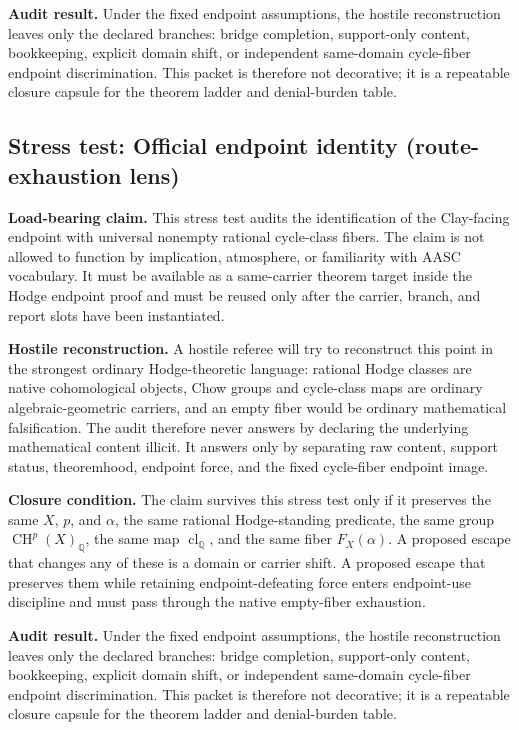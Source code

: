 \documentclass[11pt]{article}
\newcommand{\QQ}{\mathbb{Q}}
\newcommand{\CH}{\operatorname{CH}}
\newcommand{\clQ}{\operatorname{cl}_{\QQ}}
\begin{document}
\par\noindent\textbf{Audit result.} Under the fixed endpoint assumptions, the hostile reconstruction leaves only the declared branches: bridge completion, support-only content, bookkeeping, explicit domain shift, or independent same-domain cycle-fiber endpoint discrimination. This packet is therefore not decorative; it is a repeatable closure capsule for the theorem ladder and denial-burden table.


\subsection{Stress test: Official endpoint identity (route-exhaustion lens)}

\par\noindent\textbf{Load-bearing claim.} This stress test audits the identification of the Clay-facing endpoint with universal nonempty rational cycle-class fibers. The claim is not allowed to function by implication, atmosphere, or familiarity with AASC vocabulary. It must be available as a same-carrier theorem target inside the Hodge endpoint proof and must be reused only after the carrier, branch, and report slots have been instantiated.

\par\noindent\textbf{Hostile reconstruction.} A hostile referee will try to reconstruct this point in the strongest ordinary Hodge-theoretic language: rational Hodge classes are native cohomological objects, Chow groups and cycle-class maps are ordinary algebraic-geometric carriers, and an empty fiber would be ordinary mathematical falsification. The audit therefore never answers by declaring the underlying mathematical content illicit. It answers only by separating raw content, support status, theoremhood, endpoint force, and the fixed cycle-fiber endpoint image.

\par\noindent\textbf{Closure condition.} The claim survives this stress test only if it preserves the same $X$, $p$, and $\alpha$, the same rational Hodge-standing predicate, the same group $\CH^p(X)_\QQ$, the same map $\clQ$, and the same fiber $F_X(\alpha)$. A proposed escape that changes any of these is a domain or carrier shift. A proposed escape that preserves them while retaining endpoint-defeating force enters endpoint-use discipline and must pass through the native empty-fiber exhaustion.

\par\noindent\textbf{Audit result.} Under the fixed endpoint assumptions, the hostile reconstruction leaves only the declared branches: bridge completion, support-only content, bookkeeping, explicit domain shift, or independent same-domain cycle-fiber endpoint discrimination. This packet is therefore not decorative; it is a repeatable closure capsule for the theorem ladder and denial-burden table.
\end{document}
